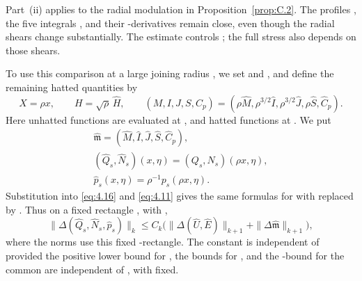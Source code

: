 Part~\textup{(ii)} applies to the radial modulation in
Proposition~\ref{prop:C.2}. The profiles , the five
integrals , and their
-derivatives remain close, even though the radial
shears  change substantially. The estimate controls
; the full stress
 also depends on those
shears.

To use this comparison at a large joining radius
, we set
 and
, and define the
remaining hatted quantities by
\begin{equation}
 X=\rho x,\qquad H=\sqrt\rho\,\widehat H,\qquad
 (M,I,J,S,C_p)
   =(\rho\widehat M,\rho^{3/2}\widehat I,\rho^{3/2}\widehat J,
     \rho\widehat S,\widehat C_p).
\tag{4.19}\label{eq:4.19}
\end{equation}
Here unhatted functions are evaluated at
, and hatted functions at
. We put
\[
\begin{gathered}
 \widehat{\mathfrak m}
   =(\widehat M,\widehat I,\widehat J,\widehat S,\widehat C_p),\\
 (\widehat Q_s,\widehat N_s)(x,\eta)=(Q_s,N_s)(\rho x,\eta),\\
 \widehat p_s(x,\eta)=\rho^{-1}p_s(\rho x,\eta).
\end{gathered}
\]
Substitution into \eqref{eq:4.16} and \eqref{eq:4.11} gives the same formulas
for  with
 replaced by . Thus on a fixed
rectangle , with
,
\[
 \|\Delta(\widehat Q_s,\widehat N_s,\widehat p_s)\|_k
 \leq C_k\bigl(\|\Delta(\widehat U,\widehat E)\|_{k+1}
                 +\|\Delta\widehat{\mathfrak m}\|_{k+1}\bigr),
\]
where the norms use this fixed -rectangle. The constant
is independent of  provided the positive lower bound
for , the bounds for
, and the
-bound for the common
 are independent of
, with  fixed.

